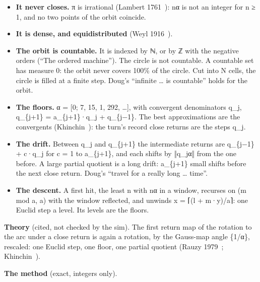 \begin{itemize}
\item \textbf{It never closes.} π is irrational (Lambert 1761~\cite{src:Lambert-1761}): nα is not an integer for n ≥ 1, and no two points of the orbit coincide.
\item \textbf{It is dense, and equidistributed} (Weyl 1916~\cite{src:Weyl-1916}).
\item \textbf{The orbit is countable.} It is indexed by ℕ, or by ℤ with the negative orders (“The ordered machine”). The circle is not countable. A countable set has measure 0: the orbit never covers 100\% of the circle. Cut into N cells, the circle is filled at a finite step. Doug's “infinite … is countable” holds for the orbit.
\item \textbf{The floors.} α = [0; 7, 15, 1, 292, …], with convergent denominators q\_\allowbreak{}j, q\_\allowbreak{}\{j+1\} = a\_\allowbreak{}\{j+1\}·q\_\allowbreak{}j + q\_\allowbreak{}\{j−1\}. The best approximations are the convergents (Khinchin~\cite{src:Khinchin-1964}): the turn's record close returns are the steps q\_\allowbreak{}j.
\item \textbf{The drift.} Between q\_\allowbreak{}j and q\_\allowbreak{}\{j+1\} the intermediate returns are q\_\allowbreak{}\{j−1\} + c·q\_\allowbreak{}j for c = 1 to a\_\allowbreak{}\{j+1\}, and each shifts by ‖q\_\allowbreak{}jα‖ from the one before. A large partial quotient is a long drift: a\_\allowbreak{}\{j+1\} small shifts before the next close return. Doug's “travel for a really long … time”.
\item \textbf{The descent.} A first hit, the least n with nα in a window, recurses on (m mod a, a) with the window reflected, and unwinds x = ⌈(l + m·y)/a⌉: one Euclid step a level. Its levels are the floors.
\end{itemize}

\textbf{Theory} (cited, not checked by the sim). The first return map of the rotation to the arc under a close return is again a rotation, by the Gauss-map angle \{1/α\}, rescaled: one Euclid step, one floor, one partial quotient (Rauzy 1979~\cite{src:Rauzy-1979}; Khinchin~\cite{src:Khinchin-1964}).

\textbf{The method} (exact, integers only).


